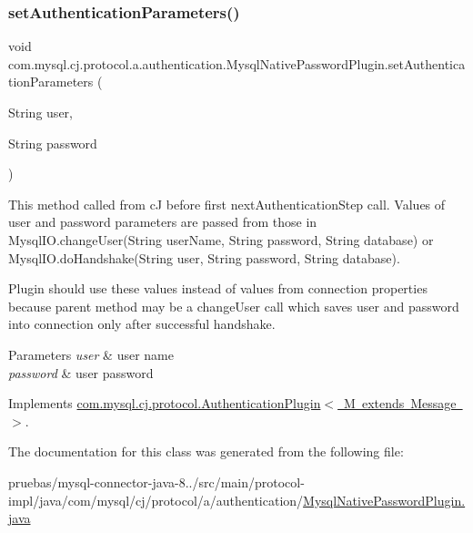 \subsubsection{\texorpdfstring{set\+Authentication\+Parameters()}{setAuthenticationParameters()}}
{\footnotesize\ttfamily void com.\+mysql.\+cj.\+protocol.\+a.\+authentication.\+Mysql\+Native\+Password\+Plugin.\+set\+Authentication\+Parameters (\begin{DoxyParamCaption}\item[{String}]{user,  }\item[{String}]{password }\end{DoxyParamCaption})}

This method called from cJ before first next\+Authentication\+Step call. Values of user and password parameters are passed from those in Mysql\+I\+O.\+change\+User(String user\+Name, String password, String database) or Mysql\+I\+O.\+do\+Handshake(String user, String password, String database).

Plugin should use these values instead of values from connection properties because parent method may be a change\+User call which saves user and password into connection only after successful handshake.


\begin{DoxyParams}{Parameters}
{\em user} & user name \\
\hline
{\em password} & user password \\
\hline
\end{DoxyParams}


Implements \mbox{\hyperlink{interfacecom_1_1mysql_1_1cj_1_1protocol_1_1_authentication_plugin_a22458c3992dbf9f91560d75a99e234d3}{com.\+mysql.\+cj.\+protocol.\+Authentication\+Plugin$<$ M extends Message $>$}}.



The documentation for this class was generated from the following file\+:\begin{DoxyCompactItemize}
\item 
pruebas/mysql-\/connector-\/java-\/8../src/main/protocol-\/impl/java/com/mysql/cj/protocol/a/authentication/\mbox{\hyperlink{_mysql_native_password_plugin_8java}{Mysql\+Native\+Password\+Plugin.\+java}}\end{DoxyCompactItemize}

